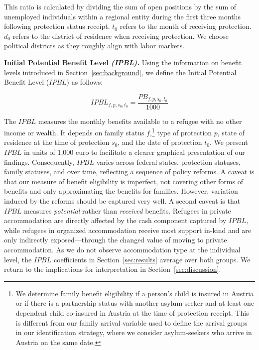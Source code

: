 This ratio is calculated by dividing the sum of open positions by the sum of unemployed individuals within a regional entity during the first three months following protection status receipt. $t_0$ refers to the month of receiving protection. $d_0$ refers to the district of residence when receiving protection. We choose political districts as they roughly align with labor markets.%


\vspace{0.5cm}
\noindent\textbf{Initial Potential Benefit Level \textit{(IPBL).}} \hspace{0.5cm} Using the information on benefit levels introduced in Section~\ref{sec:background}, we define the Initial Potential Benefit Level ($IPBL$) as follows:

\begin{equation}
\label{eq:IPBL}
IPBL_{f,p,s_0,t_0} = \frac{PB_{f,p,s_0,t_0}}{1000}
\end{equation}

The $IPBL$ measures the monthly benefits available to a refugee with no other income or wealth. It depends on family status $f$,\footnote{We determine family benefit eligibility if a person's child is insured in Austria or if there is a partnership status with another asylum-seeker and at least one dependent child co-insured in Austria at the time of protection receipt. This is different from our family arrival variable used to define the arrival groups in our identification strategy, where we consider asylum-seekers who arrive in Austria on the same date.} type of protection $p$, state of residence at the time of protection $s_0$, and the date of protection $t_0$. We present $IPBL$ in units of 1,000 euro to facilitate a clearer graphical presentation of our findings. Consequently, $IPBL$ varies across federal states, protection statuses, family statuses, and over time, reflecting a sequence of policy reforms. A caveat is that our measure of benefit eligibility is imperfect, not covering other forms of benefits and only approximating the benefits for families. However, variation induced by the reforms should be captured very well. A second caveat is that $IPBL$ measures \emph{potential} rather than \emph{received} benefits. Refugees in private accommodation are directly affected by the cash component captured by $IPBL$, while refugees in organized accommodation receive most support in-kind and are only indirectly exposed---through the changed value of moving to private accommodation. As we do not observe accommodation type at the individual level, the $IPBL$ coefficients in Section~\ref{sec:results} average over both groups. We return to the implications for interpretation in Section~\ref{sec:discussion}.

